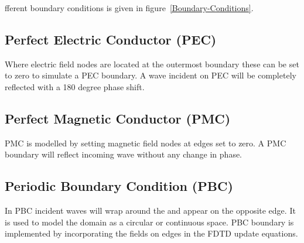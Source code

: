fferent boundary conditions is given in figure~\ref{Boundary-Conditions}.
\subsection{Perfect Electric Conductor (PEC)}
Where electric field nodes are located at the outermost boundary these can be set to zero to simulate a PEC boundary. A wave incident on PEC will be completely reflected with a 180 degree phase shift.
\subsection{Perfect Magnetic Conductor (PMC)}
PMC is modelled by setting magnetic field nodes at edges set to zero. A PMC boundary will reflect incoming wave without any change in phase.
\subsection{Periodic Boundary Condition (PBC)}
In PBC incident waves will wrap around the and appear on the opposite edge. It is used to model the domain as a circular or continuous space. PBC boundary is implemented by incorporating the fields on edges in the FDTD update equations.
